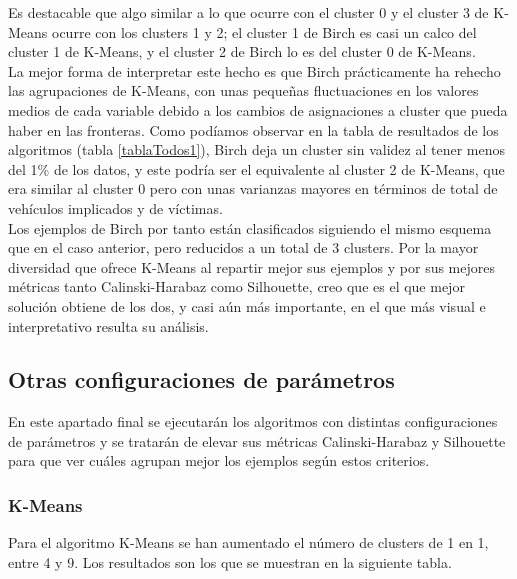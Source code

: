 	Es destacable que algo similar a lo que ocurre con el cluster 0 y el cluster 3 de K-Means ocurre con los clusters 1 y 2; el cluster 1 de Birch es casi un calco del cluster 1 de K-Means, y el cluster 2 de Birch lo es del cluster 0 de K-Means.\\
	
	La mejor forma de interpretar este hecho es que Birch prácticamente ha rehecho las agrupaciones de K-Means, con unas pequeñas fluctuaciones en los valores medios de cada variable debido a los cambios de asignaciones a cluster que pueda haber en las fronteras. Como podíamos observar en la tabla de resultados de los algoritmos (tabla \ref{tablaTodos1}), Birch deja un cluster sin validez al tener menos del 1\% de los datos, y este podría ser el equivalente al cluster 2 de K-Means, que era similar al cluster 0 pero con unas varianzas mayores en términos de total de vehículos implicados y de víctimas.\\
	
	Los ejemplos de Birch por tanto están clasificados siguiendo el mismo esquema que en el caso anterior, pero reducidos a un total de 3 clusters. Por la mayor diversidad que ofrece K-Means al repartir mejor sus ejemplos y por sus mejores métricas tanto Calinski-Harabaz como Silhouette, creo que es el que mejor solución obtiene de los dos, y casi aún más importante, en el que más visual e interpretativo resulta su análisis.
	
	\subsection{Otras configuraciones de parámetros}
	En este apartado final se ejecutarán los algoritmos con distintas configuraciones de parámetros y se tratarán de elevar sus métricas Calinski-Harabaz y Silhouette para que ver cuáles agrupan mejor los ejemplos según estos criterios.
	
	\subsubsection{K-Means}
	
	Para el algoritmo K-Means se han aumentado el número de clusters de 1 en 1, entre 4 y 9. Los resultados son los que se muestran en la siguiente tabla.
	
